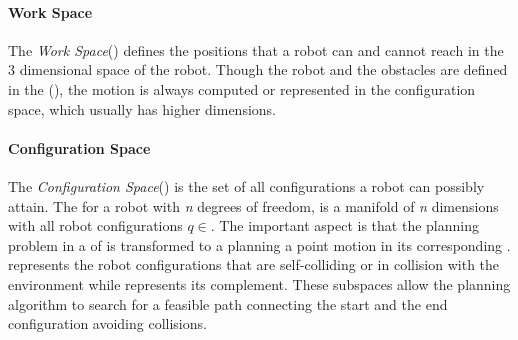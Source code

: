 \paragraph{Work Space}
The \textit{Work Space}(\WS) defines the positions that a robot can and cannot reach in the 3 dimensional space of the robot. Though the robot and the obstacles are defined in the (\WS), the motion is always computed or represented in the configuration space, which usually has higher dimensions.  

\paragraph{Configuration Space}


The \textit{Configuration Space}(\CS{}) is the set of all configurations a robot can possibly attain. The \CS{} for a robot with \textit{n} degrees of freedom, is a manifold \M{} of \textit{n} dimensions with all robot configurations $q\in$\M{}. The important aspect is that the planning problem in a \WS{} of \sethree{} is transformed to a planning a point motion in its corresponding \CS{}. \CSobst{} represents the robot configurations that are self-colliding or in collision with the environment while \CSfree{} represents its complement. These subspaces allow the planning algorithm to search for a feasible path connecting the start and the end configuration avoiding collisions. 


